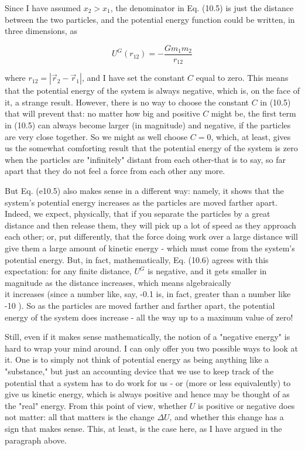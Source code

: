 \documentclass[10pt]{article}
\begin{document}
Since I have assumed $x_{2}>x_{1}$, the denominator in Eq. (10.5) is just the distance between the two particles, and the potential energy function could be written, in three dimensions, as


\begin{equation*}
U^{G}\left(r_{12}\right)=-\frac{G m_{1} m_{2}}{r_{12}} \tag{10.6}
\end{equation*}


where $r_{12}=\left|\vec{r}_{2}-\vec{r}_{1}\right|$, and I have set the constant $C$ equal to zero. This means that the potential energy of the system is always negative, which is, on the face of it, a strange result. However, there is no way to choose the constant $C$ in (10.5) that will prevent that: no matter how big and positive $C$ might be, the first term in (10.5) can always become larger (in magnitude) and negative, if the particles are very close together. So we might as well choose $C=0$, which, at least, gives us the somewhat comforting result that the potential energy of the system is zero when the particles are "infinitely" distant from each other-that is to say, so far apart that they do not feel a force from each other any more.

But Eq. (e10.5) also makes sense in a different way: namely, it shows that the system's potential energy increases as the particles are moved farther apart. Indeed, we expect, physically, that if you separate the particles by a great distance and then release them, they will pick up a lot of speed as they approach each other; or, put differently, that the force doing work over a large distance will give them a large amount of kinetic energy - which must come from the system's potential energy. But, in fact, mathematically, Eq. (10.6) agrees with this expectation: for any finite distance, $U^{G}$ is negative, and it gets smaller in magnitude as the distance increases, which means algebraically\\
it increases (since a number like, say, -0.1 is, in fact, greater than a number like -10 ). So as the particles are moved farther and farther apart, the potential energy of the system does increase - all the way up to a maximum value of zero!

Still, even if it makes sense mathematically, the notion of a "negative energy" is hard to wrap your mind around. I can only offer you two possible ways to look at it. One is to simply not think of potential energy as being anything like a "substance," but just an accounting device that we use to keep track of the potential that a system has to do work for us - or (more or less equivalently) to give us kinetic energy, which is always positive and hence may be thought of as the "real" energy. From this point of view, whether $U$ is positive or negative does not matter: all that matters is the change $\Delta U$, and whether this change has a sign that makes sense. This, at least, is the case here, as I have argued in the paragraph above.
\end{document}
